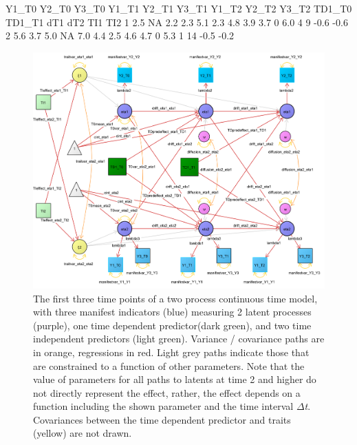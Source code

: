\documentclass[nojss]{jss}\usepackage[]{graphicx}\usepackage[]{color}
\begin{document}
\begin {footnotesize}
\begin{Schunk}
\begin{Soutput}
  Y1_T0 Y2_T0 Y3_T0 Y1_T1 Y2_T1 Y3_T1 Y1_T2 Y2_T2 Y3_T2 TD1_T0 TD1_T1 dT1 dT2  TI1  TI2
1   2.5    NA   2.2   2.3   5.1   2.3   4.8   3.9   3.7      0    6.0   4   9 -0.6 -0.6
2   5.6   3.7   5.0    NA   7.0   4.4   2.5   4.6   4.7      0    5.3   1  14 -0.5 -0.2
\end{Soutput}
\end{Schunk}
\end{footnotesize}

\begin{figure}[p]
\includegraphics[width = \textwidth]{pathdiagramtwoprocessfull2}
\caption{ \label{fig:pathdiagramtwoprocessfull} The first three time points of a two process continuous time model, with three manifest indicators (blue) measuring 2 latent processes (purple), one time dependent predictor(dark green), and two time independent predictors (light green). Variance / covariance paths are in orange, regressions in red. Light grey paths indicate those that are constrained to a function of other parameters. Note that the value of parameters for all paths to latents at time 2 and higher do not directly represent the effect, rather, the effect depends on a function including the shown parameter and the time interval $\Delta$\textit{t}. Covariances between the time dependent predictor and traits (yellow) are not drawn.}
\end{figure}
\end{document}
